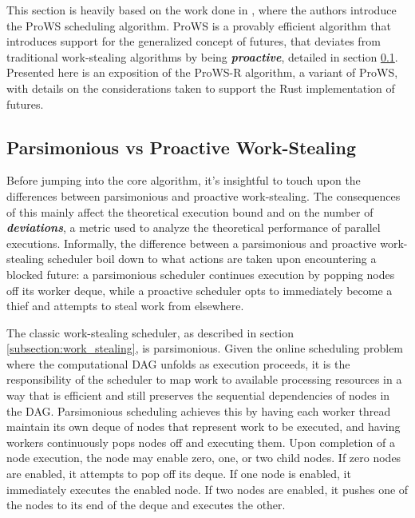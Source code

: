 \documentclass[bsc,frontabs,singlespacing,parskip,deptreport,normalheadings]{infthesis}
\begin{document}
This section is heavily based on the work done in \cite{singer_proactive_2019},
where the authors introduce the ProWS scheduling algorithm. ProWS is a provably
efficient algorithm that introduces support for the generalized concept of
futures, that deviates from traditional work-stealing algorithms by being
\textit{\textbf{proactive}}, detailed in section 
\ref{subsection:parsimonious_vs_proactive_work-stealing}. Presented here is an
exposition of the ProWS-R algorithm, a variant of ProWS, with details on the
considerations taken to support the Rust implementation of futures.

\subsection{Parsimonious vs Proactive Work-Stealing}
\label{subsection:parsimonious_vs_proactive_work-stealing}

Before jumping into the core algorithm, it's insightful to touch upon the
differences between parsimonious and proactive work-stealing. The consequences
of this mainly affect the theoretical execution bound and on the number of
\textit{\textbf{deviations}}, a metric used to analyze the theoretical
performance of parallel executions. Informally, the difference between a
parsimonious and proactive work-stealing scheduler boil down to what actions are
taken upon encountering a blocked future: a parsimonious scheduler continues
execution by popping nodes off its worker deque, while a proactive scheduler
opts to immediately become a thief and attempts to steal work from elsewhere. 

The classic work-stealing scheduler, as described in section
\ref{subsection:work_stealing}, is parsimonious. Given the online scheduling
problem where the computational DAG unfolds as execution proceeds, it is the
responsibility of the scheduler to map work to available processing resources in
a way that is efficient and still preserves the sequential dependencies of nodes
in the DAG. Parsimonious scheduling achieves this by having each worker thread
maintain its own deque of nodes that represent work to be executed, and having
workers continuously pops nodes off and executing them. Upon completion of a
node execution, the node may enable zero, one, or two child nodes. If zero nodes
are enabled, it attempts to pop off its deque. If one node is enabled, it
immediately executes the enabled node. If two nodes are enabled, it pushes one
of the nodes to its end of the deque and executes the other.
\end{document}
